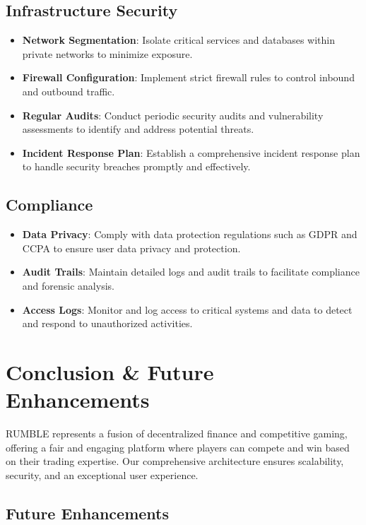 \documentclass[11pt,a4paper]{article}
\begin{document}
\subsection{Infrastructure Security}

\begin{itemize}
    \item \textbf{Network Segmentation}: Isolate critical services and databases within private networks to minimize exposure.
    \item \textbf{Firewall Configuration}: Implement strict firewall rules to control inbound and outbound traffic.
    \item \textbf{Regular Audits}: Conduct periodic security audits and vulnerability assessments to identify and address potential threats.
    \item \textbf{Incident Response Plan}: Establish a comprehensive incident response plan to handle security breaches promptly and effectively.
\end{itemize}

\subsection{Compliance}

\begin{itemize}
    \item \textbf{Data Privacy}: Comply with data protection regulations such as GDPR and CCPA to ensure user data privacy and protection.
    \item \textbf{Audit Trails}: Maintain detailed logs and audit trails to facilitate compliance and forensic analysis.
    \item \textbf{Access Logs}: Monitor and log access to critical systems and data to detect and respond to unauthorized activities.
\end{itemize}

\section{Conclusion \& Future Enhancements}

RUMBLE represents a fusion of decentralized finance and competitive gaming, offering a fair and engaging platform where players can compete and win based on their trading expertise. Our comprehensive architecture ensures scalability, security, and an exceptional user experience.

\subsection{Future Enhancements}
\end{document}
